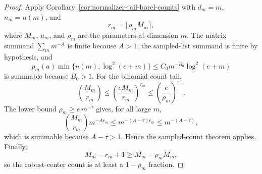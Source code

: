 \documentclass[11pt]{amsart}
\numberwithin{equation}{section}
\theoremstyle{definition}
\theoremstyle{remark}
\begin{document}
\begin{proof}
Apply Corollary~\ref{cor:normalizer-tail-borel-counts} with \(d_m=m\),
\(n_m=n(m)\), and
\[
  r_m=\lceil\rho_mM_m\rceil ,
\]
where \(M_m\), \(u_m\), and \(\rho_m\) are the parameters at dimension \(m\).
The matrix summand \(\sum_m m^{-A}\) is finite because \(A>1\), the sampled-list
summand is finite by hypothesis, and
\[
  p_m(a)\min\{n(m),\log^2(e+m)\}
  \le C_0m^{-B_0}\log^2(e+m)
\]
is summable because \(B_0>1\).  For the binomial count tail,
\[
  \binom{M_m}{r_m}
  \le \left(\frac{eM_m}{r_m}\right)^{r_m}
  \le \left(\frac e{\rho_m}\right)^{r_m}.
\]
The lower bound \(\rho_m\ge e\,m^{-\tau}\) gives, for all large \(m\),
\[
  \binom{M_m}{r_m}m^{-A r_m}
  \le m^{-(A-\tau) r_m}\le m^{-(A-\tau)},
\]
which is summable because \(A-\tau>1\).  Hence the sampled-count theorem applies.
Finally,
\[
  M_m-r_m+1\ge M_m-\rho_mM_m,
\]
so the robust-center count is at least a \(1-\rho_m\) fraction.
\end{proof}
\end{document}
